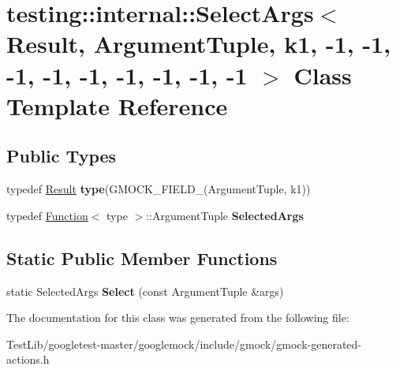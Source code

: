 \hypertarget{classtesting_1_1internal_1_1SelectArgs_3_01Result_00_01ArgumentTuple_00_01k1_00_01-1_00_01-1_00_6a5fc7802a60cf36c89bd10623cc9552}{}\section{testing\+:\+:internal\+:\+:Select\+Args$<$ Result, Argument\+Tuple, k1, -\/1, -\/1, -\/1, -\/1, -\/1, -\/1, -\/1, -\/1, -\/1 $>$ Class Template Reference}
\label{classtesting_1_1internal_1_1SelectArgs_3_01Result_00_01ArgumentTuple_00_01k1_00_01-1_00_01-1_00_6a5fc7802a60cf36c89bd10623cc9552}
\subsection*{Public Types}
\begin{DoxyCompactItemize}
\item 
\mbox{\label{classtesting_1_1internal_1_1SelectArgs_3_01Result_00_01ArgumentTuple_00_01k1_00_01-1_00_01-1_00_6a5fc7802a60cf36c89bd10623cc9552_af1aee025a91b513b1d90a200748377dc}} 
typedef \hyperlink{classResult}{Result} {\bfseries type}(G\+M\+O\+C\+K\+\_\+\+F\+I\+E\+L\+D\+\_\+(Argument\+Tuple, k1))
\item 
\mbox{\label{classtesting_1_1internal_1_1SelectArgs_3_01Result_00_01ArgumentTuple_00_01k1_00_01-1_00_01-1_00_6a5fc7802a60cf36c89bd10623cc9552_a40e5cbd362d7bdd16d0d60a39b7e5c14}} 
typedef \hyperlink{structtesting_1_1internal_1_1Function}{Function}$<$ type $>$\+::Argument\+Tuple {\bfseries Selected\+Args}
\end{DoxyCompactItemize}
\subsection*{Static Public Member Functions}
\begin{DoxyCompactItemize}
\item 
\mbox{\label{classtesting_1_1internal_1_1SelectArgs_3_01Result_00_01ArgumentTuple_00_01k1_00_01-1_00_01-1_00_6a5fc7802a60cf36c89bd10623cc9552_a7aaf6f5192da4e05fbc2bf595418546b}} 
static Selected\+Args {\bfseries Select} (const Argument\+Tuple \&args)
\end{DoxyCompactItemize}


The documentation for this class was generated from the following file\+:\begin{DoxyCompactItemize}
\item 
Test\+Lib/googletest-\/master/googlemock/include/gmock/gmock-\/generated-\/actions.\+h\end{DoxyCompactItemize}

